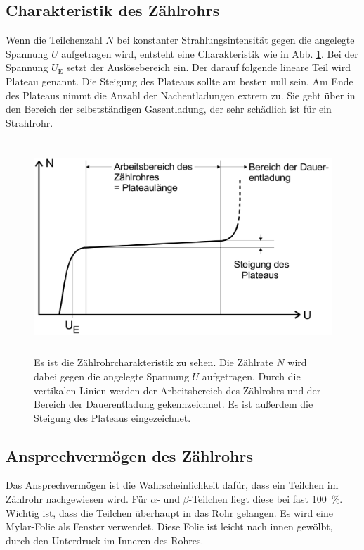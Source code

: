 \subsection{Charakteristik des Zählrohrs}

Wenn die Teilchenzahl $N$ bei konstanter Strahlungsintensität gegen die angelegte Spannung $U$ aufgetragen wird, entsteht eine Charakteristik wie in Abb. \ref{fig:charakteristik}. Bei der Spannung $U_\text{E}$ setzt der Auslösebereich ein. Der darauf folgende lineare Teil wird Plateau genannt. Die Steigung des Plateaus sollte am besten null sein. Am Ende des Plateaus nimmt die Anzahl der Nachentladungen extrem zu. Sie geht über in den Bereich der selbstständigen Gasentladung, der sehr schädlich ist für ein Strahlrohr.

\begin{figure}
    \centering
    \includegraphics[width=12cm, height=8cm]{build/charakteristik.png}
    \caption{Es ist die Zählrohrcharakteristik zu sehen. Die Zählrate $N$ wird dabei gegen die angelegte Spannung $U$ aufgetragen. Durch die vertikalen Linien werden der Arbeitsbereich des Zählrohrs und der Bereich der Dauerentladung gekennzeichnet. Es ist außerdem die Steigung des Plateaus eingezeichnet. \cite{V703}}
    \label{fig:charakteristik}
\end{figure}

\subsection{Ansprechvermögen des Zählrohrs}

Das Ansprechvermögen ist die Wahrscheinlichkeit dafür, dass ein Teilchen im Zählrohr nachgewiesen wird. Für $\alpha$- und $\beta$-Teilchen liegt diese bei fast \SI{100}{\percent}. Wichtig ist, dass die Teilchen überhaupt in das Rohr gelangen. Es wird eine Mylar-Folie als Fenster verwendet. Diese Folie ist leicht nach innen gewölbt, durch den Unterdruck im Inneren des Rohres. %